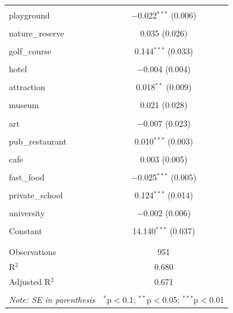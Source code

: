 \documentclass{article}
\begin{document}
\begin{table}[H]
\begin{tabular}{@{\extracolsep{-10pt}}lc}
  & \\ 
 playground & $-$0.022$^{***}$ (0.006) \\ 
  & \\ 
 nature\_reserve & 0.035 (0.026) \\ 
  & \\ 
 golf\_course & 0.144$^{***}$ (0.033) \\ 
  & \\ 
 hotel & $-$0.004 (0.004) \\ 
  & \\ 
 attraction & 0.018$^{**}$ (0.009) \\ 
  & \\ 
 museum & 0.021 (0.028) \\ 
  & \\ 
 art & $-$0.007 (0.023) \\ 
  & \\ 
 pub\_restaurant & 0.010$^{***}$ (0.003) \\ 
  & \\ 
 cafe & 0.003 (0.005) \\ 
  & \\ 
 fast\_food & $-$0.025$^{***}$ (0.005) \\ 
  & \\ 
 private\_school & 0.124$^{***}$ (0.014) \\ 
  & \\ 
 university & $-$0.002 (0.006) \\ 
  & \\ 
 Constant & 14.140$^{***}$ (0.037) \\ 
  & \\ 
\hline \\[-1.8ex] 
Observations & 951 \\ 
R$^{2}$ & 0.680 \\ 
Adjusted R$^{2}$ & 0.671 \\ 
\hline 
\hline \\[-1.8ex] 
\textit{Note: SE in parenthesis}  & \multicolumn{1}{r}{$^{*}$p$<$0.1; $^{**}$p$<$0.05; $^{***}$p$<$0.01} \\ 
\end{tabular} 
\end{table} 
\end{document}
